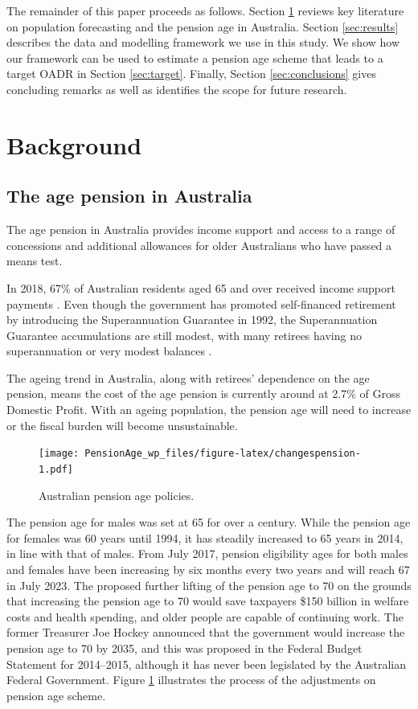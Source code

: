 \documentclass[11pt,a4paper,]{article}
\begin{document}
The remainder of this paper proceeds as follows. Section \ref{sec:litreview} reviews key literature on population forecasting and the pension age in Australia. Section \ref{sec:results} describes the data and modelling framework we use in this study. We show how our framework can be used to estimate a pension age scheme that leads to a target OADR in Section \ref{sec:target}. Finally, Section \ref{sec:conclusions} gives concluding remarks as well as identifies the scope for future research.

\hypertarget{sec:litreview}{%
\section{Background}\label{sec:litreview}}

\hypertarget{the-age-pension-in-australia}{%
\subsection{The age pension in Australia}\label{the-age-pension-in-australia}}

The age pension in Australia provides income support and access to a range of concessions and additional allowances for older Australians who have passed a means test.

In 2018, 67\% of Australian residents aged 65 and over received income support payments \autocite{AIHW19}. Even though the government has promoted self-financed retirement by introducing the Superannuation Guarantee in 1992, the Superannuation Guarantee accumulations are still modest, with many retirees having no superannuation or very modest balances \autocite{data61}.

The ageing trend in Australia, along with retirees' dependence on the age pension, means the cost of the age pension is currently around at 2.7\% of Gross Domestic Profit. With an ageing population, the pension age will need to increase or the fiscal burden will become unsustainable.

\begin{figure}
\centering
\texttt{[image: PensionAge\_wp\_files/figure-latex/changespension-1.pdf]}
\caption{\label{fig:changespension}Australian pension age policies.}
\end{figure}

The pension age for males was set at 65 for over a century. While the pension age for females was 60 years until 1994, it has steadily increased to 65 years in 2014, in line with that of males. From July 2017, pension eligibility ages for both males and females have been increasing by six months every two years and will reach 67 in July 2023. The \textcite{PC13} proposed further lifting of the pension age to 70 on the grounds that increasing the pension age to 70 would save taxpayers \$150 billion in welfare costs and health spending, and older people are capable of continuing work. The former Treasurer Joe Hockey announced that the government would increase the pension age to 70 by 2035, and this was proposed in the Federal Budget Statement for 2014--2015, although it has never been legislated by the Australian Federal Government. Figure \ref{fig:changespension} illustrates the process of the adjustments on pension age scheme.
\end{document}
